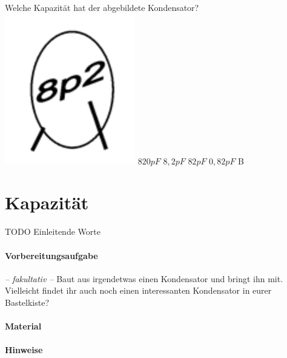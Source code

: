 {Welche Kapazität hat der abgebildete Kondensator?\\
\includegraphics[scale=0.9]{TC205.png}
}%
{$820pF$}%
{$8,2pF$}%
{$82pF$}%
{$0,82pF$}%
{B}%


\clearpage

\section{Kapazität}

TODO Einleitende Worte


\paragraph{Vorbereitungsaufgabe}

\emph{-- fakultativ --} Baut aus irgendetwas einen Kondensator und bringt ihn mit.
Vielleicht findet ihr auch noch einen interessanten Kondensator in eurer
Bastelkiste?

\paragraph{Material}


\paragraph{Hinweise}

